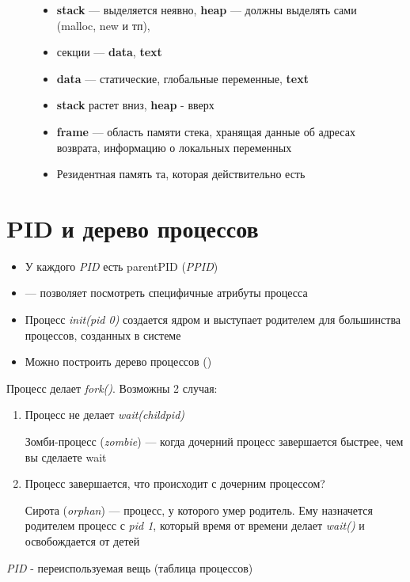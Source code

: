 \documentclass[../../lectures.tex]{subfiles}
\begin{document}
\begin{figure}[H]
\begin{minipage}[c]{0.7\linewidth}
\centering
\begin{itemize}
    \item \textbf{stack} --- выделяется неявно, \textbf{heap} --- должны выделять сами (malloc, new и тп),
    \item секции --- \textbf{data}, \textbf{text}
    \item \textbf{data} --- статические, глобальные переменные, \textbf{text}
    \item \textbf{stack} растет вниз, \textbf{heap} - вверх
    \item \textbf{frame} --- область памяти стека, хранящая данные об адресах возврата, информацию о локальных переменных
    \item Резидентная память та, которая действительно есть
\end{itemize}
\end{minipage}
\end{figure}

\section{PID и дерево процессов}
\begin{itemize}
    \item У каждого \emph{PID} есть parentPID (\emph{PPID})

    \item {} --- позволяет посмотреть специфичные атрибуты процесса

    \item Процесс \emph{init(pid 0)} создается ядром и выступает родителем для большинства процессов, созданных в системе

    \item Можно построить дерево процессов ()
\end{itemize}

Процесс делает \emph{fork()}. Возможны 2 случая:
\begin{enumerate}
    \item 
        Процесс не делает \emph{wait(childpid)}

        Зомби-процесс (\emph{zombie}) --- когда дочерний процесс завершается быстрее, чем вы сделаете wait
    \item 
        Процесс завершается, что происходит с дочерним процессом?

        Сирота (\emph{orphan}) --- процесс, у которого умер родитель. 
        Ему назначется родителем процесс с \emph{pid 1}, который время от времени делает \emph{wait()} и освобождается от детей
\end{enumerate}
\emph{PID} - переиспользуемая вещь (таблица процессов)
\end{document}
